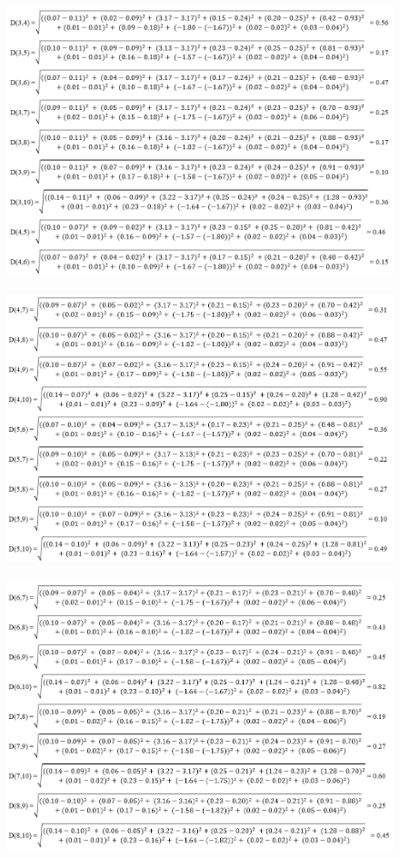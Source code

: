 \begin{enumerate}
    \begin{figure} [htbp]
    \includegraphics[scale=0.53] {figures/AHC3.PNG}
    \end{figure}
       
    
    \begin{figure} [htbp]
    \includegraphics[scale=0.53] {figures/AHC4.PNG}
    \end{figure}
       \vspace{5cm}

    
    \begin{figure} [htbp]
    \includegraphics[scale=0.52] {figures/AHC5.PNG}
    \end{figure}
   

\end{enumerate}
